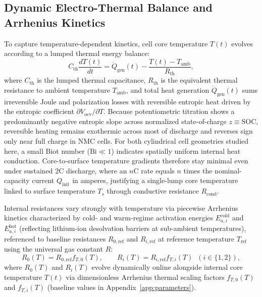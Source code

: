 \documentclass[10pt,a4paper]{article}
\begin{document}
\subsection{Dynamic Electro-Thermal Balance and Arrhenius Kinetics}
To capture temperature-dependent kinetics, cell core temperature $T(t)$ evolves according to a lumped thermal energy balance:
\begin{equation}\label{eqn:thermal_balance}
C_{\text{th}} \frac{d T(t)}{dt} = \dot{Q}_{\text{gen}}(t) - \frac{T(t) - T_{\text{amb}}}{R_{\text{th}}},
\end{equation}
where $C_{\text{th}}$ is the lumped thermal capacitance, $R_{\text{th}}$ is the equivalent thermal resistance to ambient temperature $T_{\text{amb}}$, and total heat generation $\dot{Q}_{\text{gen}}(t)$ sums irreversible Joule and polarization losses with reversible entropic heat driven by the entropic coefficient $\partial V_{\text{ocv}}/\partial T$. Because potentiometric titration shows a predominantly negative entropic slope across normalized state-of-charge $z \equiv \text{SOC}$, reversible heating remains exothermic across most of discharge and reverses sign only near full charge in NMC cells. For both cylindrical cell geometries studied here, a small Biot number ($\text{Bi} \ll 1$) indicates spatially uniform internal heat conduction. Core-to-surface temperature gradients therefore stay minimal even under sustained $2\text{C}$ discharge, where an $n\text{C}$ rate equals $n$ times the nominal-capacity current $Q_{\text{init}}$ in amperes, justifying a single-lump core temperature linked to surface temperature $T_s$ through conductive resistance $R_{\text{cond}}$.

Internal resistances vary strongly with temperature via piecewise Arrhenius kinetics characterized by cold- and warm-regime activation energies $E_{a,i}^{\text{cold}}$ and $E_{a,i}^{\text{hot}}$ (reflecting lithium-ion desolvation barriers at sub-ambient temperatures), referenced to baseline resistances $R_{0,\text{ref}}$ and $R_{i,\text{ref}}$ at reference temperature $T_{\text{ref}}$ using the universal gas constant $R$:
\begin{equation}
R_0(T) = R_{0,\text{ref}} f_{T,0}(T), \qquad R_i(T) = R_{i,\text{ref}} f_{T,i}(T) \;\; (i \in \{1, 2\}), \label{eqn:arrh_ri}
\end{equation}
where $R_0(T)$ and $R_i(T)$ evolve dynamically online alongside internal core temperature $T(t)$ via dimensionless Arrhenius thermal scaling factors $f_{T,0}(T)$ and $f_{T,i}(T)$ (baseline values in Appendix~\ref{app:parameters}).
\end{document}
